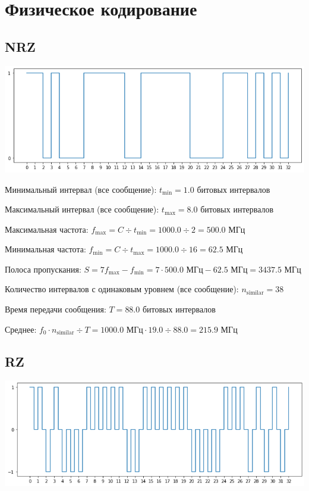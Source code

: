 \section{Физическое кодирование}
\subsection{NRZ}
\includegraphics[width=\textwidth]{1nrz}

Минимальный интервал (все сообщение): $t_\mathrm{min}=1.0$ битовых интервалов

Максимальный интервал (все сообщение): $t_\mathrm{max}=8.0$ битовых интервалов

Максимальная частота: $f_\mathrm{max}=C\div t_\mathrm{min}=1000.0\div 2=500.0$ МГц

Минимальная частота: $f_\mathrm{min}=C\div t_\mathrm{max}=1000.0\div 16=62.5$ МГц

Полоса пропускания: $S=7f_\mathrm{max}-f_\mathrm{min} = 7\cdot 500.0\text{ МГц}-62.5\text{ МГц}=3437.5$ МГц

Количество интервалов с одинаковым уровнем (все сообщение): $n_\mathrm{similar}=38$

Время передачи сообщения: $T=88.0$ битовых интервалов

Среднее: $f_0\cdot n_\mathrm{similar}\div T=1000.0\text{ МГц}\cdot 19.0\div 88.0=215.9$ МГц

\subsection{RZ}
\includegraphics[width=\textwidth]{1rz}

